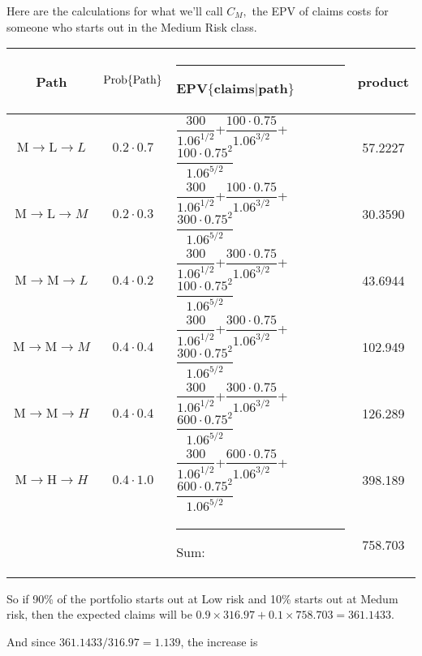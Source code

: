 {%
%
Here are the calculations for what we'll call $C_{M},$ the EPV of claims costs for someone who starts out in the Medium Risk class.
\begin{center}\begin{tabular}{ccl|c} Path & ${\rm Prob}\{\text{Path}\}$ & \rule{10pt}{0pt} EPV$\{$claims$|$path$\}$ & product \\ \hline
  \rule{0pt}{22pt}$\text{M}\rightarrow\text{L}\rightarrow{L}$  & $0.2\cdot 0.7$ & $\dfrac{300}{1.06^{1/2}}$+$\dfrac{100\cdot 0.75}{1.06^{3/2}}$+$\dfrac{100\cdot 0.75^2}{1.06^{5/2}}$ & 57.2227 \\
  \rule{0pt}{22pt}$\text{M}\rightarrow\text{L}\rightarrow{M}$  & $0.2\cdot 0.3$ & $\dfrac{300}{1.06^{1/2}}$+$\dfrac{100\cdot 0.75}{1.06^{3/2}}$+$\dfrac{300\cdot 0.75^2}{1.06^{5/2}}$ & 30.3590\\ 
  \rule{0pt}{22pt}$\text{M}\rightarrow\text{M}\rightarrow{L}$ & $0.4\cdot 0.2$ & $\dfrac{300}{1.06^{1/2}}$+$\dfrac{300\cdot 0.75}{1.06^{3/2}}$+$\dfrac{100\cdot 0.75^2}{1.06^{5/2}}$  & 43.6944 \\
  \rule{0pt}{22pt}$\text{M}\rightarrow\text{M}\rightarrow{M}$ & $0.4\cdot 0.4$ & $\dfrac{300}{1.06^{1/2}}$+$\dfrac{300\cdot 0.75}{1.06^{3/2}}$+$\dfrac{300\cdot 0.75^2}{1.06^{5/2}}$  & 102.949 \\
  \rule{0pt}{22pt}$\text{M}\rightarrow\text{M}\rightarrow{H}$ & $0.4\cdot 0.4$  & $\dfrac{300}{1.06^{1/2}}$+$\dfrac{300\cdot 0.75}{1.06^{3/2}}$+$\dfrac{600\cdot 0.75^2}{1.06^{5/2}}$  & 126.289 \\
  \rule{0pt}{22pt}$\text{M}\rightarrow\text{H}\rightarrow{H}$ & $0.4\cdot 1.0$  & $\dfrac{300}{1.06^{1/2}}$+$\dfrac{600\cdot 0.75}{1.06^{3/2}}$+$\dfrac{600\cdot 0.75^2}{1.06^{5/2}}$  &  398.189 \\
   \hline && \rule{0pt}{14pt}\rule{60pt}{0pt} Sum: & 758.703
\end{tabular}\end{center}

So if 90\% of the portfolio starts out at Low risk and 10\% starts out at Medum risk, then the expected claims will be $0.9\times 316.97 + 0.1 \times  758.703 = 361.1433.$

And since $361.1433/316.97 = 1.139$, the increase is 


\esoln} 

